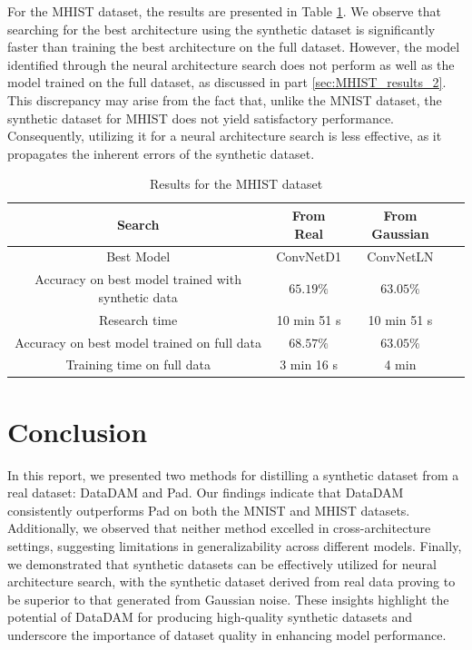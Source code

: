\documentclass[onecolumn]{IEEEtran}
\begin{document}
For the MHIST dataset, the results are presented in Table \ref{tab:NAS_results_MHIST}. We observe that searching for the best architecture using the synthetic dataset is significantly faster than training the best architecture on the full dataset. However, the model identified through the neural architecture search does not perform as well as the model trained on the full dataset, as discussed in part \ref{sec:MHIST_results_2}. This discrepancy may arise from the fact that, unlike the MNIST dataset, the synthetic dataset for MHIST does not yield satisfactory performance. Consequently, utilizing it for a neural architecture search is less effective, as it propagates the inherent errors of the synthetic dataset.

\begin{table}[H]
    \centering
    \begin{tabular}{|c|c|c|c|}
        \hline
        Search & From Real & From Gaussian \\
        \hline
        Best Model & ConvNetD1 & ConvNetLN\\
        \hline
        Accuracy on best model trained with synthetic data & $65.19\%$ & $63.05\%$ \\
        \hline
        Research time & 10 min 51 s & 10 min 51 s \\
        \hline
        Accuracy on best model trained on full data & $68.57\%$ & $63.05\%$ \\
        \hline
        Training time on full data & 3 min 16 s & 4 min \\
        \hline
    \end{tabular}
    \caption{Results for the MHIST dataset}
    \label{tab:NAS_results_MHIST}
\end{table}

\section{Conclusion}
In this report, we presented two methods for distilling a synthetic dataset from a real dataset: DataDAM and Pad. Our findings indicate that DataDAM consistently outperforms Pad on both the MNIST and MHIST datasets. Additionally, we observed that neither method excelled in cross-architecture settings, suggesting limitations in generalizability across different models. Finally, we demonstrated that synthetic datasets can be effectively utilized for neural architecture search, with the synthetic dataset derived from real data proving to be superior to that generated from Gaussian noise. These insights highlight the potential of DataDAM for producing high-quality synthetic datasets and underscore the importance of dataset quality in enhancing model performance.
\end{document}
